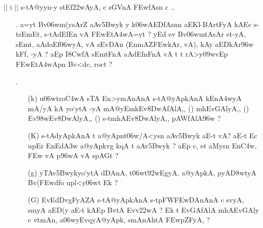 \def\DevnagVersion{2.15}\documentclass{article}
\begin{document}
\begin{center}
$||$ {\dn i }$||$ {\dn s\2-tA@yyn-y s\2tEf\322wAyA, c  s\2GVnA\2 \3FEwfAsn\2 c ..}
\end{center}

\begin{itemize}
 \item[{\dn \dnnum \rn{29}}.] {\dn a=y\?t Bv\306wm(ysAr\?Z aAv\35Bwyk y k\?\306wAEDfAsn\?n aEKl{\rs -\re}BArtFyA kAEc s\2-tsEmEt, s\2-tAd\?EfEn vA \3FEwEt\3A4wA=y\?t {\rs ?\re} yEd ev Bv\306wmtAsAr et-yA, sEmt\?, aAdoEf\306wyA, vA s\2EvDAn\2 {\rs (\re}EnmA\0Z\3FEwkAr, vA{\rs ),\re} kAy\0 aEDkAr\396w kFf, -yA {\rs ?\re} aEp I\38CwfA\2 sEmtFnA aAd\?EfnFnA\2 vA t\? t\? rA>y\?\309wvEp \3FEwEt\3A4wApn\2 Bv<dc, roc\?t {\rs ?\re}}
 
 \item[{\dn \dnnum \rn{30}}.] \begin{itemize}
                 
                 \item[({\dn k})] {\dn u\306wtro\3C4wA s\2TA En>ymAnAnA\2 s\2-tA@yApkAnA\2 kEn\3A4wyA mA/yA kA yo`ytA -yA mA@yEmkEv\38DwAfAlA,{\rs ,\re} {\rs (\re}{\dn \dnnum {}}{\rs )\re} mhEvGAlyA,{\rs ,\re} {\rs (\re}{\dn \dnnum {}}{\rs )\re} Ev\398wEv\38DwAlyA,{\rs ,\re} {\rs (\re}{\dn\dnnum {}}{\rs )\re} s\2-tmhAEv\38DwAlyA,{\rs ,\re} pAWfAlA\396w {\rs ?\re}}
                 
                 \item[({\dn K})] {\dn s\2-tAdyApkAnA\2 t\? a@yApnt\306w/A<ysn aAv\35Bwyk aE-t vA{\rs ?\re} aE-t Ec upEr EnEd\3A3w\? a@yApkvg\?{\qvb} k\?qA\2 t aAv\35Bwyk {\rs ?\re} aEp c{\rs ,\re} et aMysn\2 En\3C4w\?, \3FEw vA p\396wA vA s\2pAG\?t {\rs ?\re}} 
                 
                 \item[({\dn g})] {\dn yTAv\35Bwykyo`ytA\2 dDAnA, t\306wt\392wEg\0yA, a@yApkA, pyA\0\3D8wtyA Bv(\3FEwd\?fo upl<y\306wt\? Ek {\rs ?\re}}
                 
                 \item[({\dn G})] {\dn EvEdDvgF{\qvb}yAZA\2 s\2-tA@yApkAnA\2 s\2-tpFW\3FEwDAnAnA\2 c s\?vyA, smyA aED(y aE-t kAEp BvtA\2 Evv\322wA {\rs ?\re} Ek\2  t\? EvGAfAlA mhAEvGAly\? c vt\0mAn\4, a\306wyEvqyA@yApk\4, smAnAh\0tA\2 \3FEwpZFyA, {\rs ?\re}}  
                 \end{itemize}
                 

\end{itemize}
\end{document}

